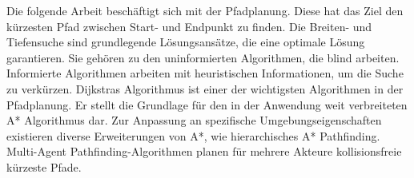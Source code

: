 \kurzfassung

Die folgende Arbeit beschäftigt sich mit der Pfadplanung. Diese hat das Ziel %
den kürzesten Pfad zwischen Start- und Endpunkt zu finden. Die Breiten- und Tiefensuche sind grundlegende Lösungsansätze, die eine optimale Lösung garantieren. Sie gehören zu den uninformierten Algorithmen, die blind arbeiten. Informierte Algorithmen arbeiten mit heuristischen Informationen, um die Suche zu verkürzen. Dijkstras Algorithmus ist einer der wichtigsten Algorithmen in der Pfadplanung. Er stellt die Grundlage für den in der Anwendung weit verbreiteten A* Algorithmus dar. Zur Anpassung an spezifische Umgebungseigenschaften existieren diverse Erweiterungen von A*, wie hierarchisches A* Pathfinding. Multi-Agent Pathfinding-Algorithmen planen für mehrere Akteure kollisionsfreie kürzeste Pfade.
